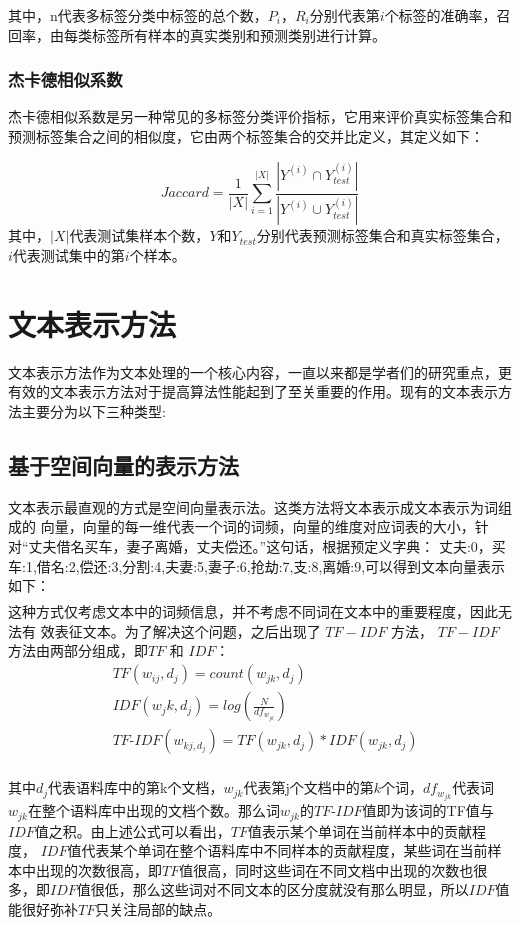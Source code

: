 其中，n代表多标签分类中标签的总个数，$P_i$，$R_i$分别代表第$i$个标签的准确率，召回率，由每类标签所有样本的真实类别和预测类别进行计算。
\subsubsection{杰卡德相似系数}
杰卡德相似系数是另一种常见的多标签分类评价指标，它用来评价真实标签集合和预测标签集合之间的相似度，它由两个标签集合的交并比定义，其定义如下：

\begin{equation*}
Jaccard =\frac{1}{|X|}\sum_{i=1}^{|X|} \frac{ | Y^{(i)} \cap Y_{test}^{(i)} | } {|Y^{(i)} \cup Y_{test}^{(i)}|}
\end{equation*}
其中，$|X|$代表测试集样本个数，$Y$和$Y_{test}$分别代表预测标签集合和真实标签集合，$i$代表测试集中的第$i$个样本。

\section{文本表示方法}
文本表示方法作为文本处理的一个核心内容，一直以来都是学者们的研究重点，更有效的文本表示方法对于提高算法性能起到了至关重要的作用。现有的文本表示方法主要分为以下三种类型:
\subsection{基于空间向量的表示方法}
文本表示最直观的方式是空间向量表示法。这类方法将文本表示成文本表示为词组成的
向量，向量的每一维代表一个词的词频，向量的维度对应词表的大小，针对“丈夫借名买车，妻子离婚，丈夫偿还。”这句话，根据预定义字典： {丈夫:0，买车:1,借名:2,偿还:3,分割:4,夫妻:5,妻子:6,抢劫:7,支:8,离婚:9},可以得到文本向量表示如下：
\begin{eqnarray*}
[2,1,1,1,0,1,0,0,0,1]
\end{eqnarray*}
这种方式仅考虑文本中的词频信息，并不考虑不同词在文本中的重要程度，因此无法有
效表征文本。为了解决这个问题，之后出现了 $TF-IDF$ 方法， $TF-IDF$ 方法由两部分组成，即$TF$ 和 $IDF$：
\begin{equation}
\begin{aligned}
    & TF(w_{ij},d_j)=count(w_{jk},d_j)\\
    & IDF(w_jk,d_j)=log(\frac{N}{df_{w_{jk}}})\\
    & TF\textrm{-}IDF(w_{kj,d_j})=TF(w_{jk},d_j)*IDF(w_{jk},d_j)\\
\end{aligned}
\end{equation}

其中$d_j$代表语料库中的第k个文档，$w_{jk}$代表第j个文档中的第$k$个词，$df_{w_{jk}}$代表词$w_{jk}$在整个语料库中出现的文档个数。那么词$w_{jk}$的$TF\textrm{-}IDF$值即为该词的TF值与$IDF$值之积。由上述公式可以看出，$TF$值表示某个单词在当前样本中的贡献程度， $IDF$值代表某个单词在整个语料库中不同样本的贡献程度，某些词在当前样本中出现的次数很高，即$TF$值很高，同时这些词在不同文档中出现的次数也很多，即$IDF$值很低，那么这些词对不同文本的区分度就没有那么明显，所以$IDF$值能很好弥补$TF$只关注局部的缺点。

